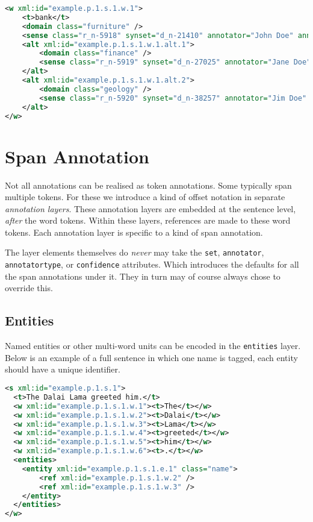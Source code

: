 \documentclass[a4paper,12pt]{report}
\begin{document}
\begin{lstlisting}[language=xml]
<w xml:id="example.p.1.s.1.w.1">
    <t>bank</t>
    <domain class="furniture" />
    <sense class="r_n-5918" synset="d_n-21410" annotator="John Doe" annotatortype="manual" confidence="1.0">zitmeubel</sense>
    <alt xml:id="example.p.1.s.1.w.1.alt.1">
        <domain class="finance" />
        <sense class="r_n-5919" synset="d_n-27025" annotator="Jane Doe" annotatortype="manual" confidence="0.6">geldverlenende instelling</sense>        
    </alt>
    <alt xml:id="example.p.1.s.1.w.1.alt.2">
        <domain class="geology" />
        <sense class="r_n-5920" synset="d_n-38257" annotator="Jim Doe" annotatortype="manual" confidence="0.1">zandbank</sense>        
    </alt>    
</w>
\end{lstlisting}


\section{Span Annotation}

Not all annotations can be realised as token annotations. Some typically span multiple tokens. For these we introduce a kind of offset notation in separate \emph{annotation layers}. These annotation layers are embedded at the sentence level, \emph{after} the word tokens. Within these layers, references are made to these word tokens. Each annotation layer is specific to a kind of span annotation.

The layer elements themselves do \emph{never} may take the \texttt{set}, \texttt{annotator}, \texttt{annotatortype}, or \texttt{confidence} attributes. Which introduces the defaults for all the span annotations under it. They in turn may of course always chose to override this.

\subsection{Entities}

Named entities or other multi-word units can be encoded in the \texttt{entities} layer. Below is an example of a full sentence in which one name is tagged, each entity should have a unique identifier.


\begin{lstlisting}[language=xml]
<s xml:id="example.p.1.s.1">
  <t>The Dalai Lama greeted him.</t>
  <w xml:id="example.p.1.s.1.w.1"><t>The</t></w>
  <w xml:id="example.p.1.s.1.w.2"><t>Dalai</t></w>
  <w xml:id="example.p.1.s.1.w.3"><t>Lama</t></w>
  <w xml:id="example.p.1.s.1.w.4"><t>greeted</t></w>
  <w xml:id="example.p.1.s.1.w.5"><t>him</t></w>
  <w xml:id="example.p.1.s.1.w.6"><t>.</t></w>
  <entities>
    <entity xml:id="example.p.1.s.1.e.1" class="name">
        <ref xml:id="example.p.1.s.1.w.2" />
        <ref xml:id="example.p.1.s.1.w.3" />
    </entity>
  </entities>
</w>
\end{lstlisting}
\end{document}
